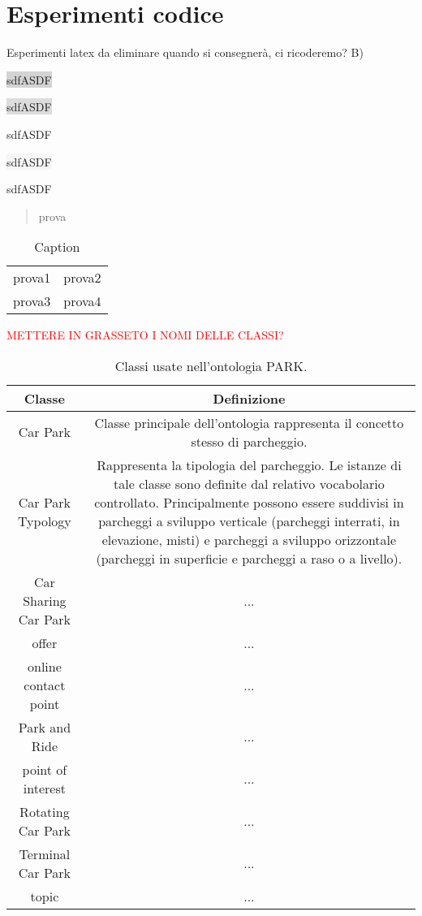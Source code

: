 \chapter{Esperimenti codice}

Esperimenti latex da eliminare quando si consegnerà, ci ricoderemo? B)

 \colorbox{lightgray}{sdfASDF}

 \colorbox{Gainsboro}{sdfASDF}

 \colorbox{Gainsboro!60!Lavender}{sdfASDF}

 \colorbox{WhiteSmoke}{sdfASDF} 

 \colorbox{WhiteSmoke!70!Lavender}{sdfASDF}

 \begin{quote}
    \centering
     prova
 \end{quote}

 \begin{table}
     \centering
     \begin{tabular}{c|c}
     \hline
         prova1 & prova2 \\
         prova3 & prova4
     \end{tabular}
     \caption{Caption}
 \end{table}

 \textcolor{red}{METTERE IN GRASSETO I NOMI DELLE CLASSI?}
\begin{table}[h]
     \centering
     \begin{tabular}{c c}
     \textbf{Classe} & \textbf{Definizione} \\
     \hline
         Car Park & Classe principale dell'ontologia rappresenta il concetto stesso di parcheggio. \\
         Car Park Typology & Rappresenta la tipologia del parcheggio. Le istanze di tale classe sono definite dal relativo vocabolario controllato. Principalmente possono essere suddivisi in parcheggi a sviluppo verticale (parcheggi interrati, in elevazione, misti) e parcheggi a sviluppo orizzontale (parcheggi in superficie e parcheggi a raso o a livello). \\
         Car Sharing Car Park & ... \\
         offer & ... \\
         online contact point  & ... \\
         Park and Ride & ... \\
         point of interest & ... \\
         Rotating Car Park & ... \\
         Terminal Car Park & ... \\
         topic & ...
     \end{tabular}
     \caption{Classi usate nell'ontologia PARK.}
 \end{table}

